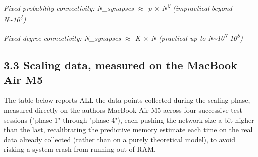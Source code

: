 \documentclass[
  english,
]{article}
\begin{document}
\emph{Fixed-probability connectivity: N\_\allowbreak{}synapses $\approx$ p $\times$ N\textsuperscript{2} (impractical beyond N\textasciitilde10\textsuperscript{4})}

\emph{Fixed-degree connectivity: N\_\allowbreak{}synapses $\approx$ K $\times$ N (practical up to N\textasciitilde10\textsuperscript{7}-10\textsuperscript{8})}

\subsection{3.3 Scaling data, measured on the MacBook Air M5}\label{scaling-data-measured-on-the-macbook-air-m5}

The table below reports ALL the data points collected during the scaling phase, measured directly on the author\textquotesingle s MacBook Air M5 across four successive test sessions ("phase 1" through "phase 4"), each pushing the network size a bit higher than the last, recalibrating the predictive memory estimate each time on the real data already collected (rather than on a purely theoretical model), to avoid risking a system crash from running out of RAM.
\end{document}
